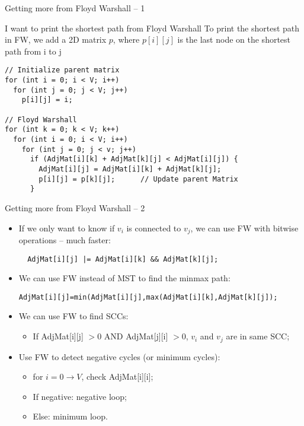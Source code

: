 \begin{frame}[fragile]{Getting more from Floyd Warshall -- 1}
  \begin{block}{I want to print the shortest path from Floyd Warshall}
To print the shortest path in FW, we add a 2D matrix $p$, where $p[i][j]$ is the last node on the shortest path from i to j
{\smaller
\begin{verbatim}
// Initialize parent matrix
for (int i = 0; i < V; i++)
  for (int j = 0; j < V; j++)
    p[i][j] = i;

// Floyd Warshall
for (int k = 0; k < V; k++)
  for (int i = 0; i < V; i++)
    for (int j = 0; j < v; j++)
      if (AdjMat[i][k] + AdjMat[k][j] < AdjMat[i][j]) {
        AdjMat[i][j] = AdjMat[i][k] + AdjMat[k][j];
        p[i][j] = p[k][j];      // Update parent Matrix
      }
\end{verbatim}}
  \end{block}
\end{frame}


\begin{frame}[fragile]{Getting more from Floyd Warshall -- 2}

  \begin{itemize}
  \item If we only want to know if $v_i$ is connected to $v_j$, we can use FW with bitwise operations -- much faster:
  \begin{verbatim}
  AdjMat[i][j] |= AdjMat[i][k] && AdjMat[k][j];
  \end{verbatim}

  \item We can use FW instead of MST to find the minmax path:
  {\smaller\begin{verbatim}
AdjMat[i][j]=min(AdjMat[i][j],max(AdjMat[i][k],AdjMat[k][j]);
\end{verbatim}}\medskip

  \item We can use FW to find SCCs:
  \begin{itemize}
    \item If AdjMat[i][j] $> 0$ AND AdjMat[j][i] $> 0$, $v_i$ and $v_j$ are in same SCC;
  \end{itemize}\medskip

  \item Use FW to detect negative cycles (or minimum cycles):
  \begin{itemize}
    \item for $i = 0\to V$, check AdjMat[i][i];
    \item If negative: negative loop;
    \item Else: minimum loop.
  \end{itemize}
  \end{itemize}
\end{frame}
